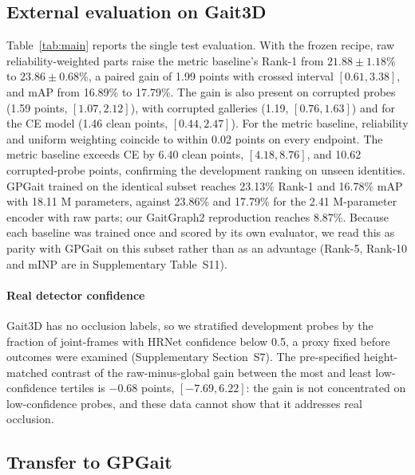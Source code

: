 \documentclass[journal]{IEEEtran}
\begin{document}
\subsection{External evaluation on Gait3D}

Table~\ref{tab:main} reports the single test evaluation. With the frozen
recipe, raw reliability-weighted parts raise the metric baseline's Rank-1 from
$21.88\pm1.18$\% to $23.86\pm0.68$\%, a paired gain of 1.99 points with crossed
interval $[0.61,3.38]$, and mAP from 16.89\% to 17.79\%. The gain is also present
on corrupted probes (1.59 points, $[1.07,2.12]$), with corrupted galleries
(1.19, $[0.76,1.63]$) and for the CE model (1.46 clean points,
$[0.44,2.47]$). For the metric baseline, reliability and uniform weighting
coincide to within 0.02 points on every endpoint. The metric baseline exceeds CE by 6.40 clean points,
$[4.18,8.76]$, and 10.62 corrupted-probe points, confirming the development
ranking on unseen identities. GPGait trained on the identical subset reaches
23.13\% Rank-1 and 16.78\% mAP with 18.11 M parameters, against 23.86\% and
17.79\% for the 2.41 M-parameter encoder with raw parts; our GaitGraph2
reproduction reaches 8.87\%. Because each baseline was trained once and scored
by its own evaluator, we read this as parity with GPGait on this subset rather
than as an advantage (Rank-5, Rank-10 and mINP are in Supplementary
Table~S11).

\paragraph{Real detector confidence}
Gait3D has no occlusion labels, so we stratified development probes by the
fraction of joint-frames with HRNet confidence below 0.5, a proxy fixed before
outcomes were examined (Supplementary Section~S7). The pre-specified
height-matched contrast of the raw-minus-global gain between the most and least
low-confidence tertiles is $-0.68$ points, $[-7.69,6.22]$: the gain is not
concentrated on low-confidence probes, and these data cannot show that it
addresses real occlusion.

\subsection{Transfer to GPGait}
\end{document}
